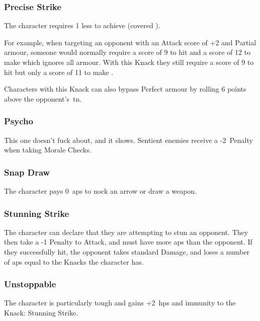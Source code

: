 \begin{multicols}{2}
\subsubsection{Precise Strike}\label{precisestrike}

The character requires 1 less to achieve  (covered ).

\begin{exampletext}
  For example, when targeting an opponent with an Attack score of +2 and Partial armour, someone would normally require a score of 9 to hit and a score of 12 to make  which ignores all armour.
  With this Knack they still require a score of 9 to hit but only a score of 11 to make .
\end{exampletext}

Characters with this Knack can also bypass Perfect armour by rolling 6 points above the opponent's~\gls{tn}.

\subsubsection{Psycho}

This one doesn't fuck about, and it shows.
Sentient enemies receive a -2~Penalty when taking Morale Checks.%

\subsubsection{Snap Draw}

The character pays 0~\glspl{ap} to nock an arrow or draw a weapon.

\subsubsection{Stunning Strike}\label{stunningstrike}

The character can declare that they are attempting to stun an opponent.
They then take a -1 Penalty to Attack, and must have more \glspl{ap} than the opponent.
If they successfully hit, the opponent takes standard Damage, and loses a number of \glspl{ap} equal to the Knacks the character has.

\subsubsection{Unstoppable}

The character is particularly tough and gains +2~\glspl{hp} and immunity to the Knack: Stunning Strike.


\end{multicols}
